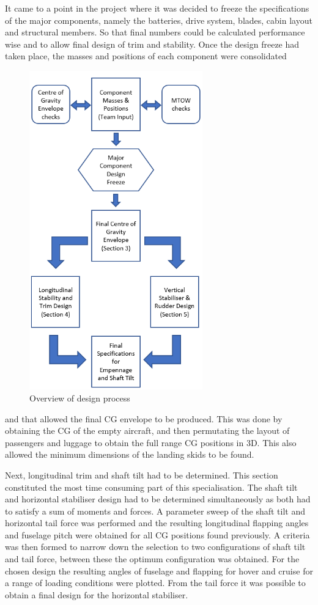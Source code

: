\documentclass[11pt,a4paper]{article}
\begin{document}
It came to a point in the project where it was decided to freeze the specifications of the major components, namely the batteries, drive system, blades, cabin layout and structural members. So that final numbers could be calculated performance wise and to allow final design of trim and stability.
Once the design freeze had taken place, the masses and positions of each component were consolidated 
\begin{figure}
\begin{center}
    \includegraphics[width=7.5cm]{Flowchart2.PNG}
\end{center}
    \caption{Overview of design process}
    \label{fig:flow}
\end{figure}
and that allowed the final CG envelope to be produced. This was done by obtaining the CG of the empty aircraft, and then permutating the layout of passengers and luggage to obtain the full range CG positions in 3D. This also allowed the minimum dimensions of the landing skids to be found. 

Next, longitudinal trim and shaft tilt had to be determined. This section constituted the most time consuming part of this specialisation. The shaft tilt and horizontal stabiliser design had to be determined simultaneously as both had to satisfy a sum of moments and forces. A parameter sweep of the shaft tilt and horizontal tail force was performed and the resulting longitudinal flapping angles and fuselage pitch were obtained for all CG positions found previously. A criteria was then formed to narrow down the selection to two configurations of shaft tilt and tail force, between these the optimum configuration was obtained. For the chosen design the resulting angles of fuselage and flapping for hover and cruise for a range of loading conditions were plotted. From the tail force it was possible to obtain a final design for the horizontal stabiliser.
\end{document}
